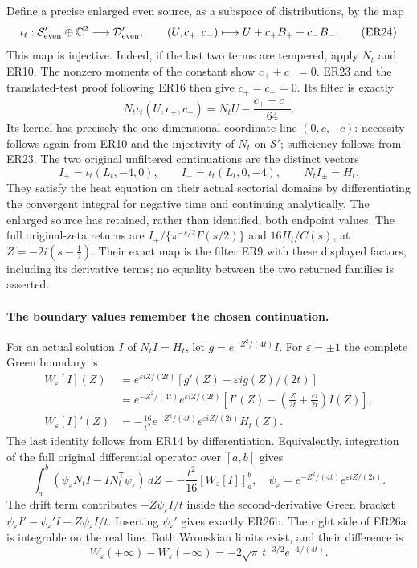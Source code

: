 Define a precise enlarged even source, as a subspace of distributions,
by the map
\[
 \iota_t:\mathcal S'_{\rm even}\oplus\mathbb C^2\longrightarrow
             \mathcal D'_{\rm even},\qquad
 (U,c_+,c_-)\longmapsto U+c_+B_++c_-B_- .
 \tag{ER24}
\]
This map is injective. Indeed, if the last two terms are tempered,
apply \(N_t\) and ER10. The nonzero moments of the constant show
\(c_++c_-=0\). ER23 and the translated-test proof following
ER16 then give \(c_+=c_-=0\). Its filter is exactly
\[
 N_t\iota_t(U,c_+,c_-)=N_tU-\frac{c_++c_-}{64}.
 \tag{ER25}
\]
Its kernel has precisely the one-dimensional coordinate line
\((0,c,-c)\): necessity follows again from ER10 and the injectivity
of \(N_t\) on \(\mathcal S'\); sufficiency follows from ER23.
The two original unfiltered continuations are the distinct vectors
\[
 I_+=\iota_t(L_t,-4,0),\qquad
 I_-=\iota_t(L_t,0,-4),\qquad N_tI_\pm=H_t.
 \tag{ER26}
\]
They satisfy the heat equation on their actual sectorial domains
by differentiating the convergent integral for negative time and
continuing analytically. The enlarged source has retained, rather
than identified, both endpoint values. The full original-zeta
returns are \(I_\pm/\{\pi^{-s/2}\Gamma(s/2)\}\) and
\(16H_t/C(s)\), at \(Z=-2i(s-\tfrac12)\). Their exact map is
the filter ER9 with these displayed factors, including its derivative
terms; no equality between the two returned families is asserted.

\paragraph{The boundary values remember the chosen continuation.}
For an actual solution \(I\) of \(N_tI=H_t\), let
\(g=e^{-Z^2/(4t)}I\). For \(\varepsilon=\pm1\) the complete
Green boundary is
\[
 \begin{split}
 W_\varepsilon[I](Z)
 &=e^{\varepsilon iZ/(2t)}
                  [g'(Z)-\varepsilon i g(Z)/(2t)]\\
 &=e^{-Z^2/(4t)}e^{\varepsilon iZ/(2t)}
       \left[I'(Z)-\left(\frac{Z}{2t}
                    +\frac{\varepsilon i}{2t}\right)I(Z)\right],\\
 W_\varepsilon[I]'(Z)
 &=-\frac{16}{t^2}e^{-Z^2/(4t)}
                       e^{\varepsilon iZ/(2t)}H_t(Z).
 \end{split}
 \tag{ER26a}
\]
The last identity follows from ER14 by differentiation.
Equivalently, integration of the full original differential operator
over \([a,b]\) gives
\[
 \int_a^b(\psi_\varepsilon N_tI-
                    I N_t^{\mathsf T}\psi_\varepsilon)\,dZ
 =-\frac{t^2}{16}[W_\varepsilon[I]]_a^b,
 \quad \psi_\varepsilon=e^{-Z^2/(4t)}e^{\varepsilon iZ/(2t)} .
 \tag{ER26b}
\]
The drift term contributes \(-Z\psi_\varepsilon I/t\) inside
the second-derivative Green bracket
\(\psi_\varepsilon I'-\psi_\varepsilon'I-Z\psi_\varepsilon I/t\).
Inserting \(\psi_\varepsilon'\) gives exactly ER26b.
The right side of ER26a is integrable on the real line. Both
Wronskian limits exist, and their difference is
\[
 W_\varepsilon(+\infty)-W_\varepsilon(-\infty)
       =-2\sqrt{\pi}\,t^{-3/2}e^{-1/(4t)}.
 \tag{ER26c}
\]

